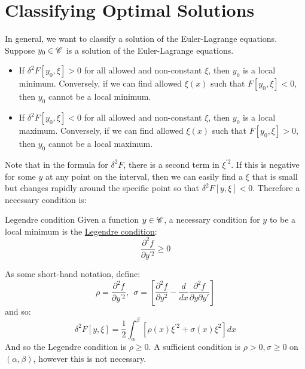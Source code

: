 \documentclass[../Main.tex]{subfiles}
\begin{document}
\section{Classifying Optimal Solutions}
In general, we want to classify a solution of the Euler-Lagrange equations. Suppose $y_0 \in \mathscr{C}$ is a solution of the Euler-Lagrange equations.
\begin{itemize}
    \item If $\delta^2 F[y_0, \xi] > 0$ for all allowed and non-constant $\xi$, then $y_0$ is a local minimum. Conversely, if we can find allowed $\xi(x)$ such that $F[y_0, \xi] < 0$, then $y_0$ cannot be a local minimum.
    \item If $\delta^2 F[y_0, \xi] < 0$ for all allowed and non-constant $\xi$, then $y_0$ is a local maximum. Conversely, if we can find allowed $\xi(x)$ such that $F[y_0, \xi] > 0$, then $y_0$ cannot be a local maximum.
\end{itemize}
Note that in the formula for $\delta^2 F$, there is a second term in $\xi^{\prime 2}$. If this is negative for some $y$ at any point on the interval, then we can easily find a $\xi$ that is small but changes rapidly around the specific point so that $\delta^2 F[y, \xi] < 0$. Therefore a necessary condition is:
\begin{definition}{Legendre condition}
    Given a function $y \in \mathscr{C}$, a necessary condition for $y$ to be a local minimum is the \underline{Legendre condition}:
    \begin{equation}
        \frac{\partial^2 f}{\partial y^{\prime 2}} \geq 0
        \label{eqnLegendreCondition}
    \end{equation}
\end{definition}
As some short-hand notation, define:
\begin{equation*}
    \rho = \frac{\partial^2 f}{\partial y^{\prime 2}},~~\sigma = \left[\frac{\partial^2 f}{\partial y^2} - \frac{d}{dx} \frac{\partial^2f}{\partial y \partial y'}\right]
\end{equation*}
and so:
\begin{equation}
    \delta^2 F[y, \xi] = \frac{1}{2} \int_\alpha^\beta \left[\rho(x) \xi^{\prime 2} + \sigma(x) \xi^2\right]dx
    \label{eqnSecondVariationShorthand}
\end{equation}
And so the Legendre condition is $\rho \geq 0$. A sufficient condition is $\rho > 0, \sigma \geq 0$ on $(\alpha, \beta)$, however this is not necessary.
\end{document}
